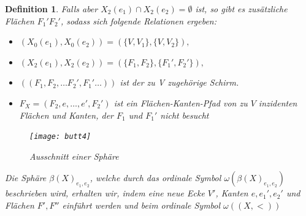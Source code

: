 \documentclass[12pt,titlepage,twoside,cleardoublepage]{article}
\theoremstyle{nummermitklammern}
\newtheorem{definition}[temp]{Definition}
\newtheorem{definition}[zahl]{Definition}
\numberwithin{equation}{section}
\begin{document}
\begin{definition}

Falls aber $X_2(e_1)\cap X_2(e_2)=\emptyset$ ist, so gibt es zusätzliche Flächen $F_1'F_2'$, sodass sich folgende Relationen ergeben: 
\begin{itemize}
\item $(X_0(e_1),X_0(e_2))=(\{V,V_1\},\{V,V_2\}),$
\item $(X_2(e_1),X_2(e_2))=(\{F_1,F_2\},\{F_1',F_2'\}),$
\item $((F_1,F_2,\ldots F_2',F_1'\ldots))$ ist der zu V zugehörige Schirm.
\item $F_X=(F_2,e,\ldots,e',F_2')$ ist ein Flächen-Kanten-Pfad von zu $V$ inzidenten Flächen und Kanten, der $F_1$ und $F_1'$ nicht besucht
\end{itemize}

\begin{figure}[H]
\begin{center}
\texttt{[image: butt4]}
\end{center}
\caption{Ausschnitt einer Sphäre}
\end{figure}

Die Sphäre $\beta(X)_{e_1,e_2}$, welche durch das ordinale Symbol $\omega(\beta(X)_{e_1,e_2})$ beschrieben wird, erhalten wir, indem eine neue Ecke $V'$, Kanten $e,e_1',e_2'$ und Flächen $F',F''$ einführt werden und beim ordinale Symbol $\omega((X,<))$


\end{definition}
\end{document}
